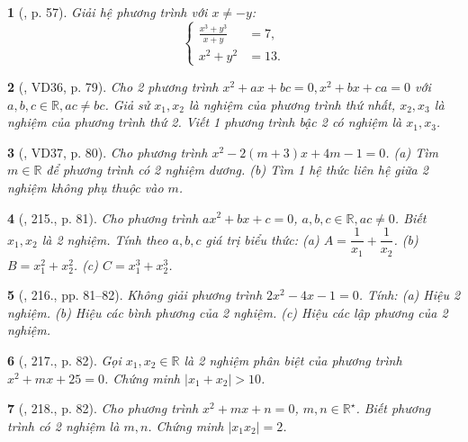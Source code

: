 \documentclass{article}
\newtheorem{baitoan}{}
\begin{document}
\begin{baitoan}[\cite{Binh_boi_duong_Toan_9_tap_2}, p. 57]
	Giải hệ phương trình với $x\ne-y$:
	\begin{equation*}
		\left\{\begin{split}
			\frac{x^3 + y^3}{x + y} &= 7,\\
			x^2 + y^2 &= 13.
		\end{split}\right.
	\end{equation*}
\end{baitoan}

\begin{baitoan}[\cite{Tuyen_Toan_9_old}, VD36, p. 79]
	Cho 2 phương trình $x^2 + ax + bc = 0,x^2 + bx + ca = 0$ với $a,b,c\in\mathbb{R},ac\ne bc$. Giả sử $x_1,x_2$ là nghiệm của phương trình thứ nhất, $x_2,x_3$ là nghiệm của phương trình thứ 2. Viết 1 phương trình bậc 2 có nghiệm là $x_1,x_3$.
\end{baitoan}

\begin{baitoan}[\cite{Tuyen_Toan_9_old}, VD37, p. 80]
	Cho phương trình $x^2 - 2(m + 3)x + 4m - 1 = 0$. (a) Tìm $m\in\mathbb{R}$ để phương trình có 2 nghiệm dương. (b) Tìm 1 hệ thức liên hệ giữa 2 nghiệm không phụ thuộc vào $m$.
\end{baitoan}

\begin{baitoan}[\cite{Tuyen_Toan_9_old}, 215., p. 81]
	Cho phương trình $ax^2 + bx + c = 0$, $a,b,c\in\mathbb{R},ac\ne0$. Biết $x_1,x_2$ là 2 nghiệm. Tính theo $a,b,c$ giá trị biểu thức: (a) $A = \dfrac{1}{x_1} + \dfrac{1}{x_2}$. (b) $B = x_1^2 + x_2^2$. (c) $C = x_1^3 + x_2^3$.
\end{baitoan}

\begin{baitoan}[\cite{Tuyen_Toan_9_old}, 216., pp. 81--82]
	Không giải phương trình $2x^2 - 4x - 1 = 0$. Tính: (a) Hiệu 2 nghiệm. (b) Hiệu các bình phương của 2 nghiệm. (c) Hiệu các lập phương của 2 nghiệm.
\end{baitoan}

\begin{baitoan}[\cite{Tuyen_Toan_9_old}, 217., p. 82]
	Gọi $x_1,x_2\in\mathbb{R}$ là 2 nghiệm phân biệt của phương trình $x^2 + mx + 25 = 0$. Chứng minh $|x_1 + x_2| > 10$.
\end{baitoan}

\begin{baitoan}[\cite{Tuyen_Toan_9_old}, 218., p. 82]
	Cho phương trình $x^2 + mx + n = 0$, $m,n\in\mathbb{R}^\star$. Biết phương trình có 2 nghiệm là $m,n$. Chứng minh $|x_1x_2| = 2$.
\end{baitoan}
\end{document}
